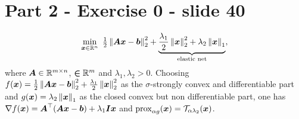 \section{Part 2 - Exercise 0 - slide 40}
%
\begin{equation*}
    \min_{\boldsymbol x \in \mathbb{R}^n}~{\textstyle\frac{1}{2}} \left\lVert\boldsymbol{Ax}-\boldsymbol b\right\rVert_{2}^2
    + \underbrace{\frac{\lambda_1}{2} \left\lVert\boldsymbol x\right\rVert_{2}^2 
    + \lambda_2 \left\lVert\boldsymbol x\right\rVert_{1}}_{\text{elastic net}},
\end{equation*}
%
where $\boldsymbol A \in \mathbb{R}^{m\times n}$, $\boldsymbol \in \mathbb{R}^m$ and 
$\lambda_1, \lambda_2>0$.
%
Choosing $f(\boldsymbol x) = {\textstyle\frac{1}{2}} \left\lVert\boldsymbol{Ax}-\boldsymbol b\right\rVert_{2}^2 
+ \frac{\lambda_1}{2} \left\lVert\boldsymbol x\right\rVert_{2}^2$ as the $\sigma$-strongly 
convex and differentiable part and 
$g(\boldsymbol x) = \lambda_2 \left\lVert\boldsymbol x\right\rVert_{1}$ as the closed 
convex but non differentiable part, one has 
$\nabla f(\boldsymbol x) = \boldsymbol A^\top (\boldsymbol{Ax}-\boldsymbol b) + \lambda_1 
\boldsymbol{Ix}$ and $\operatorname{prox}_{\alpha g}(\boldsymbol x) = 
\mathcal T_{\alpha\lambda_2}(\boldsymbol x)$.
%
